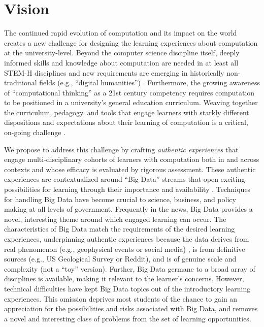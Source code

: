 \documentclass[11pt]{article}
\begin{document}
\newcommand{\NP}{\mbox{${\cal NP}$}}
\renewcommand{\floatpagefraction}{.90} %
\renewcommand{\textfraction}{.10}

\pagestyle{empty}

\section{Vision}
The continued rapid evolution of computation and its impact on the world creates a new challenge for designing the learning experiences about computation at the university-level.
Beyond the computer science discipline itself, deeply informed skills and knowledge about computation are needed in at least all STEM-H disciplines and new requirements are emerging in historically non-traditional fields (e.g., ``digital humanities'') \cite{day2011, bundy2007}.
Furthermore, the growing awareness of ``computational thinking'' as a 21st century competency requires computation to be positioned in a university's general education curriculum\cite{wing2006}.
Weaving together the curriculum, pedagogy, and tools that engage learners with starkly different dispositions and expectations about their learning of computation is a critical, on-going challenge \cite{weinberg2013, Cordova}.

We propose to address this challenge by crafting \textit{authentic experiences} that engage multi-disciplinary cohorts of learners with computation both in and across contexts and whose efficacy is evaluated by rigorous assessment.
These authentic experiences are contextualized around ``Big Data'' streams that open exciting possibilities for learning through their importance and availability \cite{McKinsey} .
Techniques for handling Big Data have become crucial to science, business, and policy making at all levels of government\cite{theory-end}.
Frequently in the news, Big Data provides a novel, interesting theme around which engaged learning can occur\cite{knobelsdorf2007computer}.
The characteristics of Big Data match the requirements of the desired learning experiences, underpinning authentic experiences because the data derives from real phenomenon (e.g., geophysical events or social media) \cite{Egger, Waldman}, is from definitive sources (e.g., US Geological Survey or Reddit), and is of genuine scale and complexity (not a ``toy'' version)\cite{Anderson}.
Further, Big Data germane to a broad array of disciplines is available, making it relevant to the learner's concerns.
However, technical difficulties have kept Big Data topics out of the introductory learning experiences\cite{McKinsey}.
This omission deprives most students of the chance to gain an appreciation for the possibilities and risks associated with Big Data, and removes a novel and interesting class of problems from the set of learning opportunities.
\end{document}
